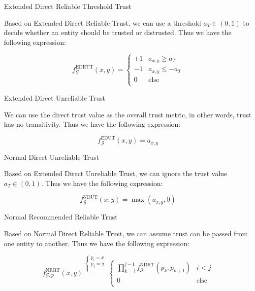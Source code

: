 \documentclass{article}
\begin{document}
Extended Direct Reliable Threshold Trust

Based on Extended Direct Reliable Trust, we can use a threshold \(a_T\in (0,1)\) to decide whether an entity should be trusted or distrusted. Thus
we have the following expression:

\begin{equation}
f_{\mathcal{G}}^{\text{EDRTT}}(x,y)=\left\{
\begin{array}{cc}
 +1 & a_{x,y}\geq a_T \\
 -1 & a_{x,y}\leq -a_T \\
 0 & \text{else} \\
\end{array}
\right.
\end{equation}

Extended Direct Unreliable Trust

We can use the direct trust value as the overall trust metric, in other words, trust has no transitivity. Thus we have the following expression:

\begin{equation}
f_{\mathcal{G}}^{\text{EDUT}}(x,y)=a_{x,y}
\end{equation}

Normal Direct Unreliable Trust

Based on Extended Direct Unreliable Trust, we can ignore the trust value \(a_T\in (0,1)\). Thus we have the following expression:

\begin{equation}
f_{\mathcal{G}}^{\text{NDUT}}(x,y)=\max \left(a_{x,y},0\right)
\end{equation}

Normal Recommended Reliable Trust

Based on Normal Direct Reliable Trust, we can assume trust can be passed from one entity to another. Thus we have the following expression:

\begin{equation}
f_{\mathcal{G},\mathit{p}}^{\text{NRRT}}(x,y)\overset{\left\{
\begin{array}{c}
 \mathit{p}_i=x \\
 \mathit{p}_j=y \\
\end{array}
\right.}{=}\left\{
\begin{array}{cc}
 \prod _{k=i}^{j-1} f_{\mathcal{G}}^{\text{NDRT}}\left(\mathit{p}_k,p_{k+1}\right) & i<j \\
 0 & \text{else} \\
\end{array}
\right.
\end{equation}
\end{document}
